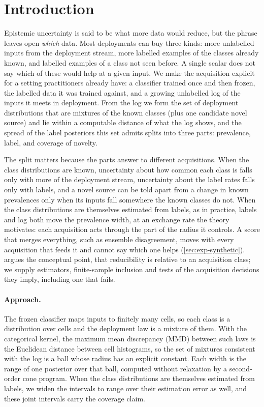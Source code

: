 \section{Introduction}
\label{sec:intro}

Epistemic uncertainty is said to be what more data would reduce, but the phrase leaves open
\emph{which} data. Most deployments can buy three kinds: more unlabelled inputs from the
deployment stream, more labelled examples of the classes already known, and labelled examples of
a class not seen before. A single scalar does not say which of these would help at a given
input. We make the acquisition explicit for a setting practitioners already
have: a classifier trained once and then frozen, the labelled data it was trained against, and a
growing unlabelled log of the inputs it meets in deployment. From the log we form the set of
deployment distributions that are mixtures of the known classes (plus one candidate novel source)
and lie within a computable distance of what the log shows, and the spread of the label
posteriors this set admits splits into three parts: prevalence, label, and coverage of novelty.

The split matters because the parts answer to different acquisitions. When the class distributions
are known, uncertainty about how common each class is falls only with more of the deployment stream,
uncertainty about the label rates falls only with labels, and a novel source can be told apart from a
change in known prevalences only when its inputs fall somewhere the known classes do not. When the
class distributions are themselves estimated from labels, as in practice, labels and log both move the
prevalence width, at an exchange rate the theory motivates: each acquisition acts through the part of
the radius it controls. A score that merges everything, such as ensemble disagreement, moves
with every acquisition that feeds it and cannot say which one helps (\cref{sec:exp-synthetic}).
\citet{young2026epistemic} argues the conceptual point, that reducibility is relative to an
acquisition class; we supply estimators, finite-sample inclusion and tests of the acquisition
decisions they imply, including one that fails.

\paragraph{Approach.} The frozen classifier maps inputs to finitely many cells, so each class is a
distribution over cells and the deployment law is a mixture of them. With the categorical kernel,
the maximum mean discrepancy (MMD) between such laws is the Euclidean distance between cell
histograms, so the set of mixtures consistent with the log is a ball whose radius has an explicit
constant. Each width is the range of one posterior over that ball, computed without relaxation by a
second-order cone program. When the class distributions are themselves estimated from labels,
we widen the intervals to range over their estimation error as well, and these joint intervals
carry the coverage claim.

